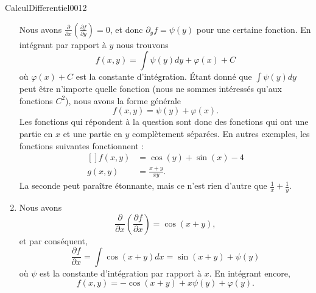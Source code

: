 \begin{corrige}{CalculDifferentiel0012}
\begin{enumerate}
			Nous avons $\frac{ \partial  }{ \partial x }\left( \frac{ \partial f }{ \partial y } \right)=0$, et donc $\partial_yf=\psi(y)$ pour une certaine fonction. En intégrant par rapport à $y$ nous trouvons
			\begin{equation}
				f(x,y)=\int\psi(y)dy+\varphi(x)+C
			\end{equation}
			où $\varphi(x)+C$ est la constante d'intégration. Étant donné que $\int\psi(y)dy$ peut être n'importe quelle fonction (nous ne sommes intéressés qu'aux fonctions $C^2$), nous avons la forme générale
			\begin{equation}
				f(x,y)=\psi(y)+\varphi(x).
			\end{equation}
            Les fonctions qui répondent à la question sont donc des fonctions qui ont une partie en \( x\) et une partie en \( y\) complètement séparées. En autres exemples, les fonctions suivantes fonctionnent :
			\begin{equation}
				\begin{aligned}[]
					f(x,y)&=\cos(y)+\sin(x)-4\\
					g(x,y)&=\frac{ x+y }{ xy }.
				\end{aligned}
			\end{equation}
			La seconde peut paraître étonnante, mais ce n'est rien d'autre que $\frac{1}{ x }+\frac{1}{ y }$.
		\item
			Nous avons
			\begin{equation}
				\frac{ \partial  }{ \partial x }\left( \frac{ \partial f }{ \partial x } \right)=\cos(x+y),
			\end{equation}
			et par conséquent,
			\begin{equation}
				\frac{ \partial f }{ \partial x }=\int \cos(x+y)dx=\sin(x+y)+\psi(y)
			\end{equation}
			où $\psi$ est la constante d'intégration par rapport à $x$. En intégrant encore,
			\begin{equation}
				f(x,y)=-\cos(x+y)+x\psi(y)+\varphi(y).
			\end{equation}
	\end{enumerate}
\end{corrige}
